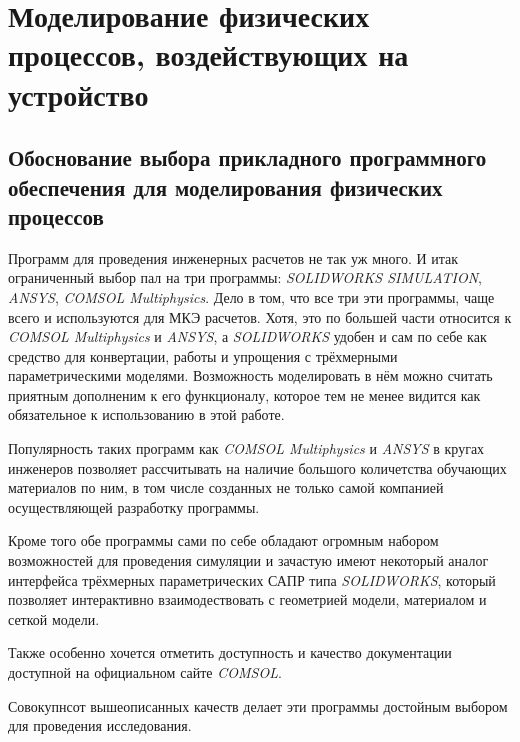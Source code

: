 \section{Моделирование физических процессов, воздействующих на устройство}
\subsection{Обоснование выбора прикладного программного обеспечения для моделирования физических процессов}

Программ для проведения инженерных расчетов не так уж много. И итак ограниченный выбор пал на три программы: \textit{SOLIDWORKS SIMULATION},
\textit{ANSYS}, \textit{COMSOL Multiphysics}. Дело в том, что все три эти программы, чаще всего и используются для МКЭ расчетов. Хотя, это по большей части относится к \textit{COMSOL Multiphysics} и \textit{ANSYS}, а \textit{SOLIDWORKS} удобен и сам по себе как средство для конвертации, работы и упрощения с трёхмерными параметрическими моделями.
Возможность моделировать в нём можно считать приятным дополненим к его функционалу, которое тем не менее видится как обязательное к использованию в этой работе.

Популярность таких программ как \textit{COMSOL Multiphysics} и \textit{ANSYS} в кругах инженеров позволяет рассчитывать на наличие большого количетства обучающих материалов по ним, в том числе созданных не только самой компанией осуществляющей разработку программы.

Кроме того обе программы сами по себе обладают огромным набором возможностей для проведения симуляции и зачастую имеют некоторый аналог интерфейса трёхмерных параметрических САПР типа \textit{SOLIDWORKS}, который позволяет интерактивно взаимодествовать с геометрией модели, материалом и сеткой модели.

Также особенно хочется отметить доступность и качество документации доступной на официальном сайте \textit{COMSOL}.

Совокупнсот вышеописанных качеств делает эти программы достойным выбором для проведения исследования.